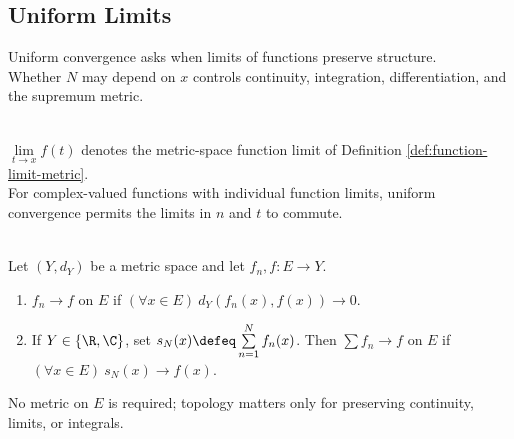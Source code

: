 \subsection{Uniform Limits}

%


Uniform convergence asks when limits of functions preserve structure.\\
Whether $N$ may depend on $x$ controls continuity, integration, differentiation, and the supremum metric.

\begin{perspective} \label{per:function-limits-before-function-sequences} \\
$\lim\limits_{t\to x}f(t)$ denotes the metric-space function limit of Definition \ref{def:function-limit-metric}.\\
For complex-valued functions with individual function limits, uniform convergence permits the limits in $n$ and $t$ to commute.
\end{perspective}

\begin{definition} \label{def:pointwise-convergence-functions} \\
Let $(Y,d_Y)$ be a metric space and let $f_n,f:E\to Y$.
\begin{enumerate}[label=(\roman*)]
\setlength{\itemsep}{0pt}
\item $f_n\to f$  on $E$ if $(\forall x\in E)\ d_Y(f_n(x),f(x))\to0$.
\item If $Y\in\{\R,\C\}$, set $s_N(x)\defeq\sum\limits_{n=1}^{N}f_n(x)$. Then $\sum f_n\to f$  on $E$ if $(\forall x\in E)\ s_N(x)\to f(x)$.
\end{enumerate}
No metric on $E$ is required; topology matters only for preserving continuity, limits, or integrals.
\end{definition}

